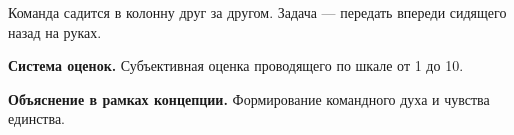 
\par Команда садится в колонну друг за другом. Задача --- передать впереди сидящего назад на руках.

\par \textbf{Система оценок.} Субъективная оценка проводящего по шкале от 1 до 10.

\par \textbf{Объяснение в рамках концепции.} Формирование командного духа и чувства единства.